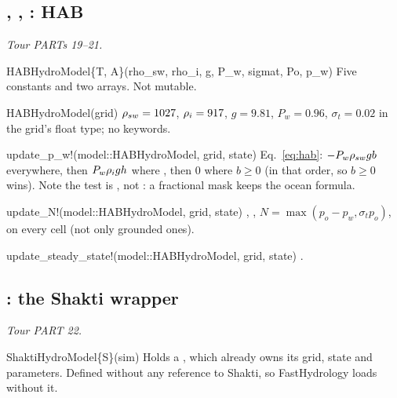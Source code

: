 \subsection{, , : HAB}\label{ref:hab}
\emph{Tour PARTs 19--21.}
\begin{fnlist}
\item[HABHydroModel\{T, A\}(rho\_sw, rho\_i, g, P\_w, sigmat, Po, p\_w)] Five constants and two arrays. Not mutable.
\item[HABHydroModel(grid)] ${\rho_{sw}} = 1027$, ${\rho_i} = 917$, $g = 9.81$, $P_w = 0.96$, $\sigma_t = 0.02$ in the grid's float type; no keywords.
\item[update\_p\_w!(model::HABHydroModel, grid, state)] Eq.~\eqref{eq:hab}: $-P_w{\rho_{sw}} g b$ everywhere, then $P_w{\rho_i} g h$ where
  , then 0 where $b\ge0$ (in that order, so $b\ge0$ wins). Note the test is , not : a
  fractional mask keeps the ocean formula.
\item[update\_N!(model::HABHydroModel, grid, state)] , , $N = \max(p_o - p_w, \sigma_t p_o)$, on every
  cell (not only grounded ones).
\item[update\_steady\_state!(model::HABHydroModel, grid, state)] .
\end{fnlist}

\subsection{: the Shakti wrapper}\label{ref:shakti}
\emph{Tour PART 22.}
\begin{fnlist}
\item[ShaktiHydroModel\{S\}(sim)] Holds a , which already owns its grid, state and parameters. Defined without
  any reference to Shakti, so FastHydrology loads without it.
\end{fnlist}

